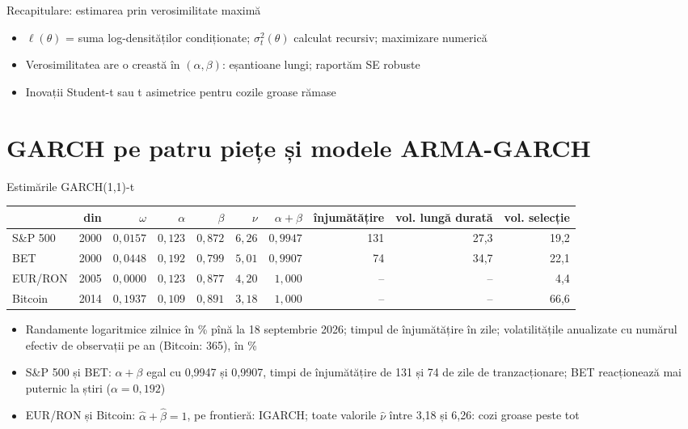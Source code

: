 \begin{frame}{Recapitulare: estimarea prin verosimilitate maximă}
\itemsize{\small}
\begin{itemize}
    \item $\ell(\theta)$ = suma log-densităților condiționate; $\sigma_t^2(\theta)$ calculat recursiv; maximizare numerică
    \item Verosimilitatea are o creastă în $(\alpha, \beta)$: eșantioane lungi; raportăm SE robuste
    \item Inovații Student-t sau t asimetrice pentru cozile groase rămase
\end{itemize}
\end{frame}


\section{GARCH pe patru piețe și modele ARMA-GARCH}

\begin{frame}{Estimările GARCH(1,1)-t}
\itemsize{\footnotesize}
\begin{center}
\scriptsize
\begin{tabular}{lrrrrrrrrr}
\toprule
& din & $\omega$ & $\alpha$ & $\beta$ & $\nu$ & $\alpha + \beta$ & înjumătățire & vol. lungă durată & vol. selecție \\
\midrule
S\&P 500 & 2000 & $0{,}0157$ & $0{,}123$ & $0{,}872$ & $6{,}26$ & $0{,}9947$ & 131 & 27{,}3 & 19{,}2 \\
BET & 2000 & $0{,}0448$ & $0{,}192$ & $0{,}799$ & $5{,}01$ & $0{,}9907$ & 74 & 34{,}7 & 22{,}1 \\
EUR/RON & 2005 & $0{,}0000$ & $0{,}123$ & $0{,}877$ & $4{,}20$ & $1{,}000$ & -- & -- & 4{,}4 \\
Bitcoin & 2014 & $0{,}1937$ & $0{,}109$ & $0{,}891$ & $3{,}18$ & $1{,}000$ & -- & -- & 66{,}6 \\
\bottomrule
\end{tabular}
\end{center}
\begin{itemize}
    \item Randamente logaritmice zilnice în \% pînă la 18 septembrie 2026; timpul de înjumătățire în zile; volatilitățile anualizate cu numărul efectiv de observații pe an (Bitcoin: 365), în \%
    \item S\&P 500 și BET: $\alpha + \beta$ egal cu 0{,}9947 și 0{,}9907, timpi de înjumătățire de 131 și 74 de zile de tranzacționare; BET reacționează mai puternic la știri ($\alpha = 0{,}192$)
    \item EUR/RON și Bitcoin: $\hat\alpha + \hat\beta = 1$, pe frontieră: IGARCH; toate valorile $\hat\nu$ între 3{,}18 și 6{,}26: cozi groase peste tot
\end{itemize}
\end{frame}

